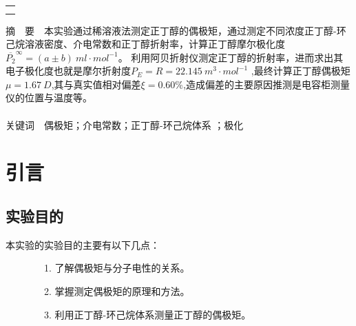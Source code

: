 \documentclass[12pt]{article}
\begin{document}
\begin{titlepage}
\begin{center}
\begin{tabular}{cp{5cm}}
            \end{tabular}
            \begin{tabular*}{\textwidth}{c}
                \\ %
                \\ %
                \\ %
                \hline %
            \end{tabular*}
        \end{center}
        \textsf{\textcolor{BrickRed}{摘\ \ 要}}\ \ 本实验通过稀溶液法测定正丁醇的偶极矩，通过测定不同浓度正丁醇-环己烷溶液密度、介电常数和正丁醇折射率，计算正丁醇摩尔极化度$\overline{P_{2}}^{\infty }=(a\pm b) \ ml\cdot mol^{-1} $。
		利用阿贝折射仪测定正丁醇的折射率，进而求出其电子极化度也就是摩尔折射度$P_{E}=R=22.145 \ m^{3}\cdot mol^{-1}$ ,最终计算正丁醇偶极矩$\mu =1.67 \ D$,其与真实值相对偏差$\xi =0.60 \% $,造成偏差的主要原因推测是电容柜测量仪的位置与温度等。
        \\
        \\
        \textsf{\textcolor{BrickRed}{关键词}}\ \ 偶极矩；介电常数；正丁醇-环己烷体系 ；极化
    \end{titlepage}

    \section{引言}
		\subsection{实验目的}
			本实验的实验目的主要有以下几点\citealp{physchemlab}：\par
			\ \ \ \ \ \ \ \ 1. 了解偶极矩与分子电性的关系。\par
			\ \ \ \ \ \ \ \	2. 掌握测定偶极矩的原理和方法。\par
			\ \ \ \ \ \ \ \	3. 利用正丁醇-环己烷体系测量正丁醇的偶极矩。\par
		\par
\end{document}
